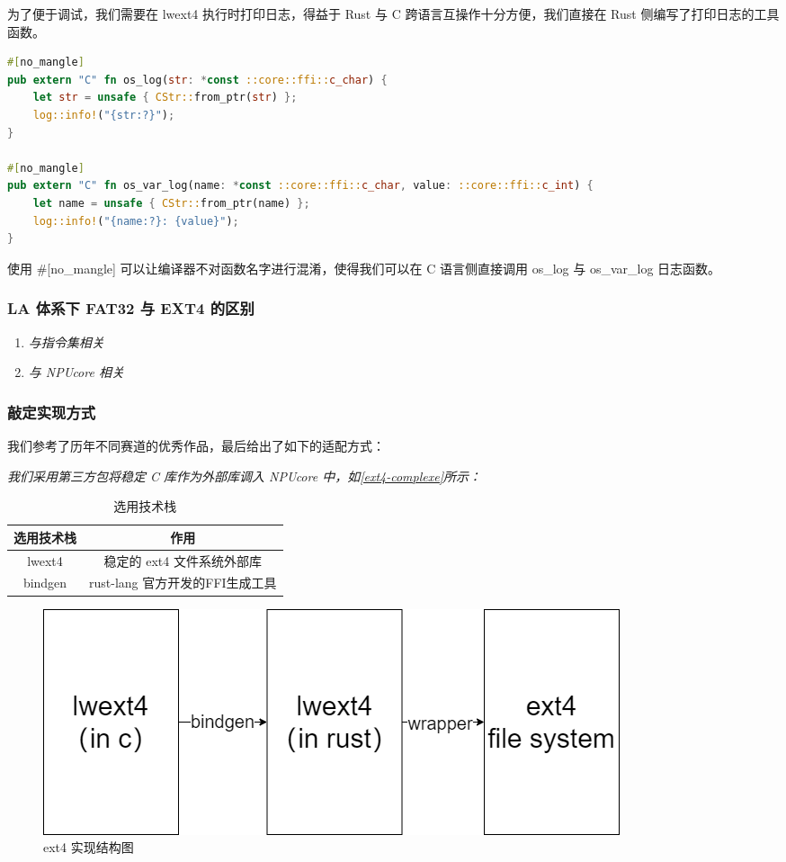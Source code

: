 为了便于调试，我们需要在 lwext4 执行时打印日志，得益于 Rust 与 C 跨语言互操作十分方便，我们直接在 Rust 侧编写了打印日志的工具函数。

\begin{lstlisting}[language={Rust}, caption={在 lwext4 的 C 语言代码中打印日志}]
#[no_mangle]
pub extern "C" fn os_log(str: *const ::core::ffi::c_char) {
    let str = unsafe { CStr::from_ptr(str) };
    log::info!("{str:?}");
}

#[no_mangle]
pub extern "C" fn os_var_log(name: *const ::core::ffi::c_char, value: ::core::ffi::c_int) {
    let name = unsafe { CStr::from_ptr(name) };
    log::info!("{name:?}: {value}");
}
\end{lstlisting}

使用 \#[no_mangle] 可以让编译器不对函数名字进行混淆，使得我们可以在 C 语言侧直接调用 os_log 与 os_var_log 日志函数。


\subsubsection{LA 体系下 FAT32 与 EXT4 的区别}

\begin{enumerate}
    \item \textit{与指令集相关}
    \item \textit{与 NPUcore 相关}
\end{enumerate}

\subsubsection{敲定实现方式}

我们参考了历年不同赛道的优秀作品，最后给出了如下的适配方式：

\textit{我们采用第三方包将稳定 C 库作为外部库调入 NPUcore 中，如\autoref{ext4-complexe}所示：}

\begin{table}[htbp]
    \centering
    \begin{tabular}{|c|c|}
        \hline
        选用技术栈 & 作用 \\
        \hline
        lwext4 & 稳定的 ext4 文件系统外部库 \\
        bindgen & rust-lang 官方开发的FFI生成工具 \\
        \hline
    \end{tabular}
    \caption{选用技术栈}
\end{table}


\begin{figure}
    \centering
    \includegraphics[width=0.6\linewidth]{figs/plan-ext.png}
    \caption{ext4 实现结构图}
    \label{ext4-complexe}
\end{figure}

